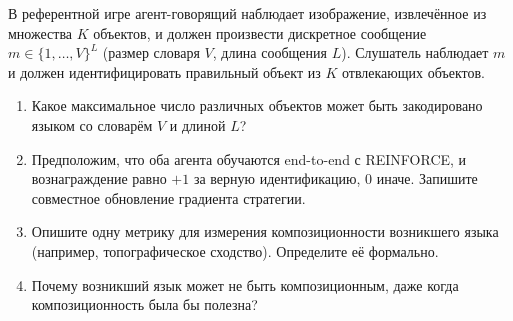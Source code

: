 \begin{exercise}
\label{ex:emergent-language}
В референтной игре агент-говорящий наблюдает изображение, извлечённое из
множества $K$ объектов, и должен произвести дискретное сообщение
$m \in \{1, \ldots, V\}^L$ (размер словаря $V$, длина сообщения $L$).
Слушатель наблюдает $m$ и должен идентифицировать правильный объект из $K$
отвлекающих объектов.
\begin{enumerate}[label=(\alph*)]
  \item Какое максимальное число различных объектов может быть
    закодировано языком со словарём $V$ и длиной $L$?
  \item Предположим, что оба агента обучаются end-to-end с REINFORCE,
    и вознаграждение равно $+1$ за верную идентификацию, $0$ иначе.
    Запишите совместное обновление градиента стратегии.
  \item Опишите одну метрику для измерения композиционности
    возникшего языка (например, топографическое сходство). Определите её
    формально.
  \item Почему возникший язык может не быть композиционным,
    даже когда композиционность была бы полезна?
\end{enumerate}
\end{exercise}
